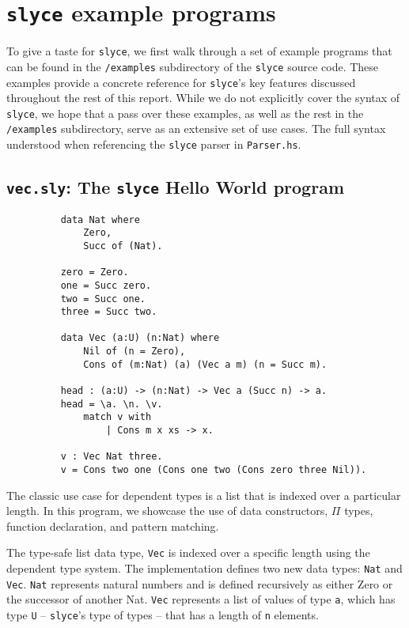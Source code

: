 \section{\texttt{slyce} example programs}
To give a taste for \texttt{slyce}, we first walk through a set of example programs that can be found in the \texttt{/examples} subdirectory of the \texttt{slyce} source code.
These examples provide a concrete reference for \texttt{slyce}'s key features discussed throughout the rest of this report.
While we do not explicitly cover the syntax of \texttt{slyce}, we hope that a pass over these examples, as well as the rest in the \texttt{/examples} subdirectory, serve as an extensive set of use cases.
The full syntax understood when referencing the \texttt{slyce} parser in \texttt{Parser.hs}.
 
\subsection{\texttt{vec.sly}: The \texttt{slyce} Hello World program}
\begin{figure}[h!]
\begin{lstlisting}
    data Nat where
        Zero,
        Succ of (Nat).

    zero = Zero.
    one = Succ zero.
    two = Succ one.
    three = Succ two.

    data Vec (a:U) (n:Nat) where
        Nil of (n = Zero),
        Cons of (m:Nat) (a) (Vec a m) (n = Succ m).

    head : (a:U) -> (n:Nat) -> Vec a (Succ n) -> a.
    head = \a. \n. \v.
        match v with
            | Cons m x xs -> x.

    v : Vec Nat three.
    v = Cons two one (Cons one two (Cons zero three Nil)).
\end{lstlisting}
\end{figure}

The classic use case for dependent types is a list that is indexed over a particular length.
In this program, we showcase the use of data constructors, $\Pi$ types, function declaration, and pattern matching.

The type-safe list data type, \texttt{Vec} is indexed over a specific length using the dependent type system. 
The implementation defines two new data types: \texttt{Nat} and \texttt{Vec}. 
\texttt{Nat} represents natural numbers and is defined recursively as either Zero or the successor of another Nat. 
\texttt{Vec} represents a list of values of type \texttt{a}, which has type \texttt{U} -- \texttt{slyce}'s type of types -- that has a length of \texttt{n} elements.

